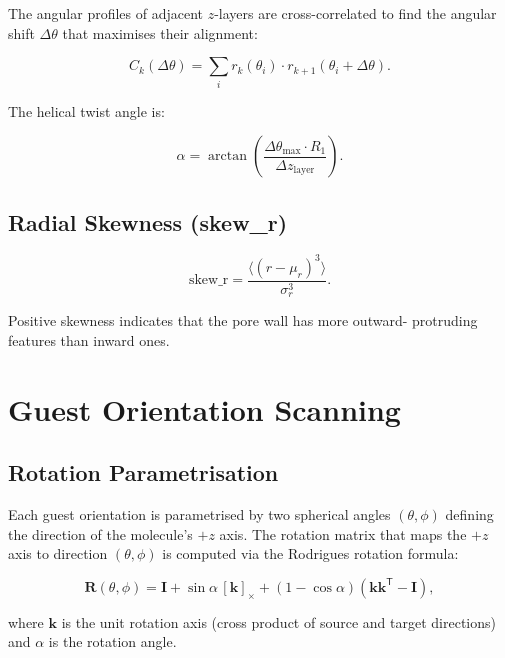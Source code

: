 \documentclass[11pt,a4paper]{article}
\newcommand{\vect}[1]{\bm{#1}}
\begin{document}
The angular profiles of adjacent $z$-layers are cross-correlated to find
the angular shift $\Delta\theta$ that maximises their alignment:

\begin{equation}
C_k(\Delta\theta) = \sum_i r_k(\theta_i) \cdot r_{k+1}(\theta_i + \Delta\theta).
\end{equation}

The helical twist angle is:

\begin{equation}
\alpha = \arctan\!\left(
\frac{\Delta\theta_{\max} \cdot R_1}{\Delta z_{\text{layer}}}
\right).
\end{equation}

\subsection{Radial Skewness (skew\_r)}

\begin{equation}
\text{skew\_r} = \frac{\langle (r - \mu_r)^3 \rangle}{\sigma_r^3}.
\end{equation}

Positive skewness indicates that the pore wall has more outward-
protruding features than inward ones.

\section{Guest Orientation Scanning}

\subsection{Rotation Parametrisation}

Each guest orientation is parametrised by two spherical angles
$(\theta, \phi)$ defining the direction of the molecule's $+z$ axis.
The rotation matrix that maps the $+z$ axis to direction
$(\theta, \phi)$ is computed via the Rodrigues rotation formula:

\begin{equation}
\vect{R}(\theta, \phi) = \vect{I} + \sin\alpha \,[\vect{k}]_\times +
(1 - \cos\alpha) (\vect{k} \vect{k}^{\mathsf T} - \vect{I}),
\end{equation}

where $\vect{k}$ is the unit rotation axis (cross product of source and
target directions) and $\alpha$ is the rotation angle.
\end{document}
